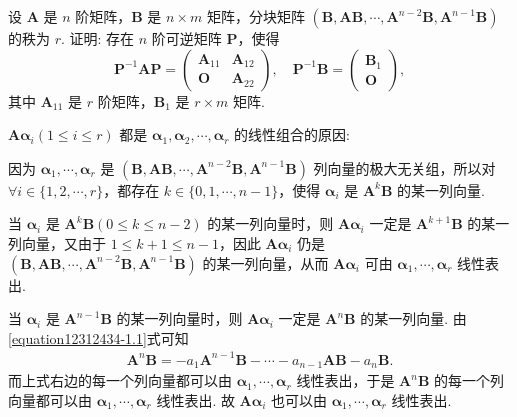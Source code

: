 \documentclass[../../main.tex]{subfiles}%
\begin{document}
\begin{example}
设 $\boldsymbol{A}$ 是 $n$ 阶矩阵，$\boldsymbol{B}$ 是 $n\times m$ 矩阵，分块矩阵 $(\boldsymbol{B},\boldsymbol{A}\boldsymbol{B},\cdots,\boldsymbol{A}^{n - 2}\boldsymbol{B},\boldsymbol{A}^{n - 1}\boldsymbol{B})$ 的秩为 $r$. 证明: 存在 $n$ 阶可逆矩阵 $\boldsymbol{P}$，使得
\[
\boldsymbol{P}^{-1}\boldsymbol{A}\boldsymbol{P}=\begin{pmatrix}
\boldsymbol{A}_{11} & \boldsymbol{A}_{12} \\
\boldsymbol{O} & \boldsymbol{A}_{22}
\end{pmatrix}, \quad
\boldsymbol{P}^{-1}\boldsymbol{B}=\begin{pmatrix}
\boldsymbol{B}_1 \\
\boldsymbol{O}
\end{pmatrix},
\]
其中 $\boldsymbol{A}_{11}$ 是 $r$ 阶矩阵，$\boldsymbol{B}_1$ 是 $r\times m$ 矩阵.
\end{example}
\begin{remark}
\hypertarget{例题0.7容易验证的原因}{$\boldsymbol{A}\boldsymbol{\alpha}_i(1\leqslant  i\leqslant  r)$ 都是 $\boldsymbol{\alpha}_1,\boldsymbol{\alpha}_2,\cdots,\boldsymbol{\alpha}_r$ 的线性组合的原因:}因为 $\boldsymbol{\alpha}_1,\cdots,\boldsymbol{\alpha}_r$ 是 $(\boldsymbol{B},\boldsymbol{A}\boldsymbol{B},\cdots,\boldsymbol{A}^{n - 2}\boldsymbol{B},\boldsymbol{A}^{n - 1}\boldsymbol{B})$ 列向量的极大无关组，所以对 $\forall i\in\{1,2,\cdots,r\}$，都存在 $k\in\{0,1,\cdots,n - 1\}$，使得 $\boldsymbol{\alpha}_i$ 是 $\boldsymbol{A}^k\boldsymbol{B}$ 的某一列向量.

当 $\boldsymbol{\alpha}_i$ 是 $\boldsymbol{A}^k\boldsymbol{B}(0\leqslant k\leqslant n - 2)$ 的某一列向量时，则 $\boldsymbol{A}\boldsymbol{\alpha}_i$ 一定是 $\boldsymbol{A}^{k + 1}\boldsymbol{B}$ 的某一列向量，又由于 $1\leqslant k + 1\leqslant n - 1$，因此 $\boldsymbol{A}\boldsymbol{\alpha}_i$ 仍是 $(\boldsymbol{B},\boldsymbol{AB},\cdots,\boldsymbol{A}^{n - 2}\boldsymbol{B},\boldsymbol{A}^{n - 1}\boldsymbol{B})$ 的某一列向量，从而 $\boldsymbol{A}\boldsymbol{\alpha}_i$ 可由 $\boldsymbol{\alpha}_1,\cdots,\boldsymbol{\alpha}_r$ 线性表出.

当 $\boldsymbol{\alpha}_i$ 是 $\boldsymbol{A}^{n - 1}\boldsymbol{B}$ 的某一列向量时，则 $\boldsymbol{A}\boldsymbol{\alpha}_i$ 一定是 $\boldsymbol{A}^n\boldsymbol{B}$ 的某一列向量. 由\eqref{equation12312434-1.1}式可知
\begin{align*}
\boldsymbol{A}^n\boldsymbol{B}=-a_1\boldsymbol{A}^{n - 1}\boldsymbol{B}-\cdots - a_{n - 1}\boldsymbol{A}\boldsymbol{B}-a_n\boldsymbol{B}.
\end{align*}
而上式右边的每一个列向量都可以由 $\boldsymbol{\alpha}_1,\cdots,\boldsymbol{\alpha}_r$ 线性表出，于是 $\boldsymbol{A}^n\boldsymbol{B}$ 的每一个列向量都可以由 $\boldsymbol{\alpha}_1,\cdots,\boldsymbol{\alpha}_r$ 线性表出. 故 $\boldsymbol{A}\boldsymbol{\alpha}_i$ 也可以由 $\boldsymbol{\alpha}_1,\cdots,\boldsymbol{\alpha}_r$ 线性表出. 
\end{remark}
\end{document}
